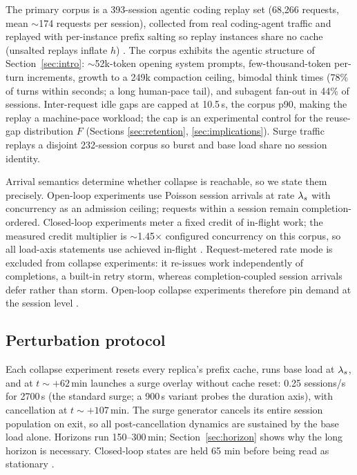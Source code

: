 The primary corpus is a 393-session agentic coding replay set
(68,266 requests, mean $\sim$174 requests per session), collected from
real coding-agent traffic and replayed with per-instance prefix
salting so replay instances share no cache (unsalted replays inflate
$h$) . The corpus exhibits the agentic structure of
Section~\ref{sec:intro}: $\sim$52k-token opening system prompts, few-thousand-token
per-turn increments, growth to a 249k compaction ceiling, bimodal
think times (78\% of turns within seconds; a long human-pace tail),
and subagent fan-out in 44\% of sessions. Inter-request idle gaps are
capped at 10.5\,s, the corpus p90, making the replay a machine-pace
workload; the cap is an experimental control for the reuse-gap
distribution $F$ (Sections \ref{sec:retention}, \ref{sec:implications}). Surge traffic replays a disjoint
232-session corpus so burst and base load share no session identity.

Arrival semantics determine whether collapse is reachable, so we
state them precisely. Open-loop experiments use Poisson session
arrivals at rate $\lambda_s$ with concurrency as an admission ceiling;
requests within a session remain completion-ordered. Closed-loop
experiments meter a fixed credit of in-flight work; the measured
credit multiplier is $\sim$1.45$\times$ configured concurrency on this corpus,
so all load-axis statements use achieved in-flight .
Request-metered rate mode is excluded from collapse experiments: it
re-issues work independently of completions, a built-in retry storm,
whereas completion-coupled session arrivals defer rather than storm.
Open-loop collapse experiments therefore pin demand at the session
level .

\subsection{Perturbation protocol}
\label{sec:protocol}

Each collapse experiment resets every replica's prefix cache, runs
base load at $\lambda_s$, and at $t \sim +62$\,min launches a surge overlay
without cache reset: 0.25 sessions/s for 2700\,s (the standard surge;
a 900\,s variant probes the duration axis), with cancellation at
$t \sim +107$\,min. The surge generator cancels its entire session
population on exit, so all post-cancellation dynamics are sustained
by the base load alone. Horizons run 150--300\,min; Section~\ref{sec:horizon} shows
why the long horizon is necessary. Closed-loop states are held 65
min before being read as stationary .

